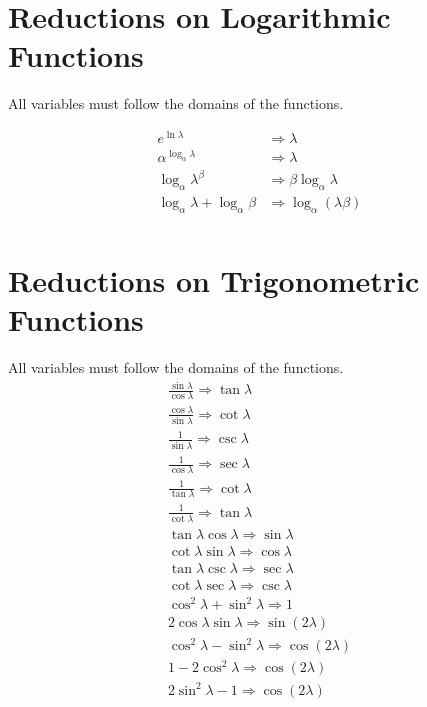 \documentclass[11pt,a4paper]{book}
\begin{document}
\section{Reductions on Logarithmic Functions}

All variables must follow the domains of the functions.

\begin{align}
e^{\ln\lambda} &\Rightarrow \lambda\\
\alpha^{\log_\alpha\lambda} &\Rightarrow \lambda \\
\log_{\alpha}\lambda^\beta &\Rightarrow \beta \log_\alpha \lambda \\
\log_{\alpha}\lambda + \log_\alpha\beta &\Rightarrow \log_{\alpha} (\lambda\beta) \\
\end{align}

\section{Reductions on Trigonometric Functions}
All variables must follow the domains of the functions.
\begin{eqnarray}
\frac{\sin\lambda}{\cos \lambda} \Rightarrow \tan \lambda \\
\frac{\cos \lambda}{\sin \lambda} \Rightarrow \cot \lambda \\
\frac{1}{\sin \lambda} \Rightarrow \csc\lambda \\
\frac{1}{\cos \lambda} \Rightarrow \sec\lambda \\
\frac{1}{\tan\lambda} \Rightarrow \cot \lambda \\
\frac{1}{\cot \lambda} \Rightarrow \tan \lambda \\
\tan \lambda \cos\lambda \Rightarrow \sin \lambda \\
\cot \lambda \sin \lambda \Rightarrow \cos \lambda \\
\tan \lambda \csc \lambda \Rightarrow \sec \lambda \\
\cot \lambda \sec \lambda \Rightarrow \csc \lambda \\
\cos^2 \lambda + \sin^2 \lambda \Rightarrow 1 \\
2 \cos \lambda \sin \lambda \Rightarrow \sin \left(2 \lambda\right) \\
\cos^2 \lambda - \sin^2 \lambda \Rightarrow \cos \left(2 \lambda \right) \\
1 - 2\cos^2\lambda \Rightarrow \cos \left(2 \lambda \right) \\
2\sin^2\lambda - 1 \Rightarrow \cos \left(2 \lambda \right)
\end{eqnarray}
\end{document}
